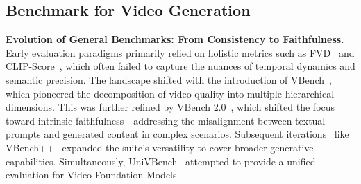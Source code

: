 \documentclass{llmxive}
\begin{document}




\subsection{Benchmark for Video Generation}

\noindent
\textbf{Evolution of General Benchmarks: From Consistency to Faithfulness.} Early evaluation paradigms primarily relied on holistic metrics such as FVD~\cite{fvd} and CLIP-Score~\cite{clip}, which often failed to capture the nuances of temporal dynamics and semantic precision. The landscape shifted with the introduction of VBench~\cite{vbench}, which pioneered the decomposition of video quality into multiple hierarchical dimensions. This was further refined by VBench 2.0~\cite{vbench2}, which shifted the focus toward intrinsic faithfulness—addressing the misalignment between textual prompts and generated content in complex scenarios. Subsequent iterations~\cite{msvbench,muss,avgenbench} like VBench++~\cite{vbench++} expanded the suite's versatility to cover broader generative capabilities. Simultaneously, UniVBench~\cite{univbench} attempted to provide a unified evaluation for Video Foundation Models.
\end{document}
